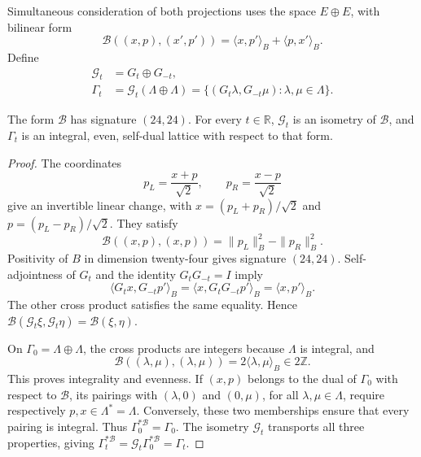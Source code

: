 Simultaneous consideration of both projections uses the space
\(E\oplus E\), with bilinear form
\begin{equation}
 \mathcal B((x,p),(x',p'))
 =\langle x,p'\rangle_B+\langle p,x'\rangle_B.
 \label{corpus9:xii:forma-bilineal-partida}
\end{equation}
Define
\begin{equation}
 \begin{aligned}
 \mathcal G_t&=G_t\oplus G_{-t},\\
 \Gamma_t&=\mathcal G_t(\Lambda\oplus\Lambda)
 =\{(G_t\lambda,G_{-t}\mu):\lambda,\mu\in\Lambda\}.
 \end{aligned}
 \label{corpus9:xii:red-partida}
\end{equation}

\begin{theorem}
\label{corpus9:xii:teorema-partido}
The form \(\mathcal B\) has signature \((24,24)\).
For every \(t\in\mathbb R\), \(\mathcal G_t\) is an isometry of
\(\mathcal B\), and \(\Gamma_t\) is an integral, even, self-dual
lattice with respect to that form.
\end{theorem}
\begin{proof}
The coordinates
\[
 p_L=\frac{x+p}{\sqrt2},\qquad p_R=\frac{x-p}{\sqrt2}
\]
give an invertible linear change, with
\(x=(p_L+p_R)/\sqrt2\) and \(p=(p_L-p_R)/\sqrt2\). They satisfy
\[
 \mathcal B((x,p),(x,p))=\|p_L\|_B^2-\|p_R\|_B^2.
\]
Positivity of \(B\) in dimension twenty-four gives signature
\((24,24)\). Self-adjointness of \(G_t\) and the identity
\(G_tG_{-t}=I\) imply
\[
 \langle G_tx,G_{-t}p'\rangle_B
 =\langle x,G_tG_{-t}p'\rangle_B=\langle x,p'\rangle_B.
\]
The other cross product satisfies the same equality. Hence
\(\mathcal B(\mathcal G_t\xi,\mathcal G_t\eta)
=\mathcal B(\xi,\eta)\).

On \(\Gamma_0=\Lambda\oplus\Lambda\), the cross products are
integers because \(\Lambda\) is integral, and
\[
 \mathcal B((\lambda,\mu),(\lambda,\mu))
 =2\langle\lambda,\mu\rangle_B\in2\mathbb Z.
\]
This proves integrality and evenness. If \((x,p)\) belongs to the
dual of \(\Gamma_0\) with respect to \(\mathcal B\), its pairings
with \((\lambda,0)\) and \((0,\mu)\), for all
\(\lambda,\mu\in\Lambda\), require respectively
\(p,x\in\Lambda^*=\Lambda\). Conversely, these two memberships
ensure that every pairing is integral. Thus
\(\Gamma_0^{*\mathcal B}=\Gamma_0\). The isometry
\(\mathcal G_t\) transports all three properties, giving
\(\Gamma_t^{*\mathcal B}=\mathcal G_t\Gamma_0^{*\mathcal B}
=\Gamma_t\).
\end{proof}

